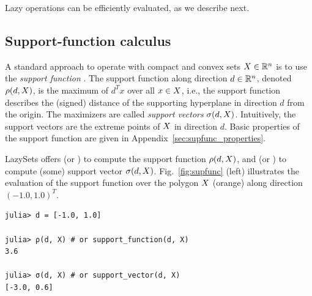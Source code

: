 \smallskip

Lazy operations can be efficiently evaluated, as we describe next.


\subsection{Support-function calculus} \label{sec:supfun}

A standard approach to operate with compact and convex sets $X \in \mathbb{R}^n$ is to use the \emph{support function} \cite{LeGuernic09}.
%
The support function along direction $d \in \mathbb{R}^n$, denoted $\rho(d, X)$, is the maximum of $d^T x$ over all $x \in X$, i.e., the support function describes the (signed) distance of the supporting hyperplane in direction $d$ from the origin.
%
The maximizers are called \emph{support vectors} $\sigma(d, X)$. Intuitively, the support vectors are the extreme points of $X$ in direction $d$.
%
Basic properties of the support function are given in Appendix~\ref{sec:supfunc_properties}.

\smallskip

LazySets offers  (or ) to compute the support function $\rho(d,X)$, and  (or ) to compute (some) support vector $\sigma(d,X)$. Fig.~\ref{fig:supfunc} (left) illustrates the evaluation of the support function over the polygon $X$ (orange) along direction $(-1.0, 1.0)^T$.

\begin{minipage}{\linewidth}
\begin{lstlisting}
julia> d = [-1.0, 1.0]

julia> ρ(d, X) # or support_function(d, X)
3.6

julia> σ(d, X) # or support_vector(d, X)
[-3.0, 0.6]
\end{lstlisting}
\end{minipage}

